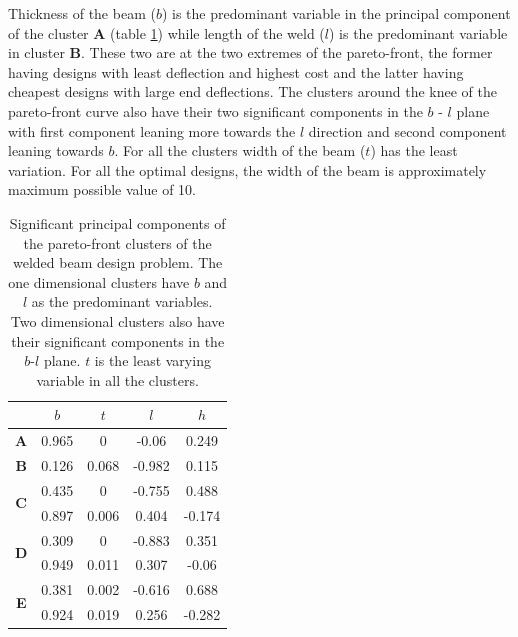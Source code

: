 Thickness of the beam ($b$) is the predominant variable in the principal
component of the cluster \textbf{A} (table \ref{first2wbeamPCs}) while
length of the weld ($l$) is the predominant variable in cluster
\textbf{B}. These two are at the two extremes of the pareto-front, the
former having designs with least deflection and highest cost and the latter
having cheapest designs with large end deflections. The clusters around the
knee of the pareto-front curve also have their two significant components
in the $b$ - $l$ plane with first component leaning more towards the $l$
direction and second component leaning towards $b$. For all the clusters
width of the beam ($t$) has the least variation. For all the optimal
designs, the width of the beam is approximately maximum possible value of
10.





\begin{table}[!ht]
  \centering
  \begin{tabular}{c|c|c|c|c|}
    \cline{2-5}
    & $b$ & $t$ & $ l$  & $h$ \\
    \hline
    \multicolumn{1}{|c|}{\textbf{A}} & 0.965 & 0 & -0.06 & 0.249 \\
    \hline
    \multicolumn{1}{|c|}{\textbf{B}} & 0.126 & 0.068 & -0.982 & 0.115\\
    \hline
    \multicolumn{1}{|c|}{\multirow{2}{*}{\textbf{C}}} & 0.435 & 0 & -0.755 & 0.488 \\ \cline{2-5}
    \multicolumn{1}{|c|}{}& 0.897 & 0.006 & 0.404 & -0.174\\
    \hline
    \multicolumn{1}{|c|}{\multirow{2}{*}{\textbf{D}}} & 0.309 & 0 & -0.883 & 0.351 \\ \cline{2-5}
    \multicolumn{1}{|c|}{}& 0.949 & 0.011 & 0.307 & -0.06\\
    \hline
    \multicolumn{1}{|c|}{\multirow{2}{*}{\textbf{E}}} & 0.381 & 0.002 & -0.616 & 0.688 \\ \cline{2-5}
    \multicolumn{1}{|c|}{}& 0.924 & 0.019 & 0.256 & -0.282\\
    \hline
  \end{tabular}
  \caption{Significant principal components of the pareto-front clusters of the welded beam design problem. The one dimensional clusters have $b$ and $l$ as the predominant variables. Two dimensional clusters also have their significant components in the $b$-$l$ plane. $t$ is the least varying variable in all the clusters.}
  \label{first2wbeamPCs}
\end{table}

